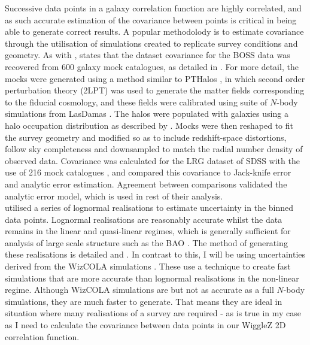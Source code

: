 \documentclass[titlesmallcaps, examinerscopy, copyrightpage]{uqthesis}
\begin{document}
Successive data points in a galaxy correlation function are highly correlated, and as such accurate estimation of the covariance between points is critical in being able to generate correct results. A popular methodolody is to estimate covariance through the utilisation of simulations created to replicate survey conditions and geometry. As with \citet{SanchezScoccola2012}, \citet{AndersonAubourg2012} states that the dataset covariance for the BOSS data was recovered from 600 galaxy mock catalogues, as detailed in \citet{ManeraScoccimarro2013}. For more detail, the mocks were generated using a method similar to PTHalos \citep{ScoccimarroSheth2002}, in which second order perturbation theory (2LPT) was used to generate the matter fields corresponding to the fiducial cosmology, and these fields were calibrated using suite of $N$-body simulations from LasDamas \citep{McBride2011}. The halos were populated with galaxies using a halo occupation distribution as described by \citet{ZhengCoilZehavi2007}. Mocks were then reshaped to fit the survey geometry and modified so as to include redshift-space distortions, follow sky completeness and downsampled to match the radial number density of observed data. Covariance was calculated for the LRG dataset of SDSS with the use of 216 mock catalogues \citep[MICEL7860; see][for details]{FosalbaGaztanaga2008, CrocceFosalbaCastander2010}, and \citet{Gaztanaga2009} compared this covariance to Jack-knife error and analytic error estimation. Agreement between comparisons validated the analytic error model, which is used in rest of their analysis.\\

\citet{BlakeDavis2011} utilised a series of lognormal realisations to estimate uncertainty in the binned data points. Lognormal realisations are reasonably accurate whilst the data remains in the linear and quasi-linear regimes, which is generally sufficient for analysis of large scale structure such as the BAO \citep{ColesJones1991}. The method of generating these realisations is detailed \citet{BlakeGlazebrook2003} and \citet{GlazebrookBlake2005}. In contrast to this, I will be using uncertainties derived from the WizCOLA simulations \citep{KodaBlake2015}. These use a technique to create fast simulations that are more accurate than lognormal realisations in the non-linear regime. Although WizCOLA simulations are but not as accurate as a full $N$-body simulations, they are much faster to generate. That means they are ideal in situation where many realisations of a survey are required - as is true in my case as I need to calculate the covariance between data points in our WiggleZ 2D correlation function.
\end{document}
